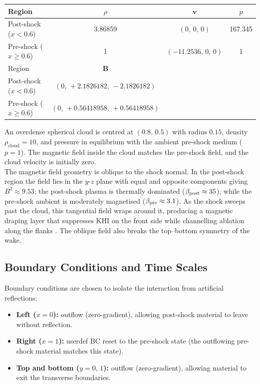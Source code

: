 \documentclass[11pt,a4paper]{article}
\begin{document}
\medskip
\begin{center}
\begin{tabular}{lccc}
\toprule Region & $\rho$ & $\mathbf{v}$ & $p$ \\ \midrule Post-shock ($x < 0.6$) & 3.86859 & $(0,\,0,\,0)$ & 167.345 \\ Pre-shock ($x \ge 0.6$) & 1 & $(-11.2536,\,0,\,0)$ & 1 \\ \midrule Region & $\mathbf{B}$ & & \\ \midrule Post-shock ($x < 0.6$) & $(0,\,+2.1826182,\,-2.1826182)$ & \\ Pre-shock ($x \ge 0.6$) & $(0,\,+0.56418958,\,+0.56418958)$ & \\ \bottomrule
\end{tabular}
\end{center}
\medskip

An overdense spherical cloud is centred at $(0.8,\,0.5)$ with radius $0.15$, density $\rho_{\mathrm{cloud}} = 10$, and pressure in equilibrium with the ambient pre-shock medium ($p = 1$). The magnetic field inside the cloud matches the pre-shock field, and the cloud velocity is initially zero.
\\

The magnetic field geometry is oblique to the shock normal. In the post-shock region the field lies in the $y$-$z$ plane with equal and opposite components giving $B^2 \approx 9.53$; the post-shock plasma is thermally dominated ($\beta_{\rm post} \approx 35$), while the pre-shock ambient is moderately magnetised ($\beta_{\rm pre} \approx 3.1$). As the shock sweeps past the cloud, this tangential field wraps around it, producing a magnetic draping layer that suppresses KHI on the front side while channelling ablation along the flanks \cite{gregori2000, shin2008, dursi2008}. The oblique field also breaks the top--bottom symmetry of the wake.

\subsection{Boundary Conditions and Time Scales}

Boundary conditions are chosen to isolate the interaction from artificial reflections:
\begin{itemize}
  \item \textbf{Left ($x = 0$):} outflow (zero-gradient), allowing post-shock material to leave without reflection.
  \item \textbf{Right ($x = 1$):} userdef BC reset to the pre-shock state (the outflowing pre-shock material matches this state).
  \item \textbf{Top and bottom ($y = 0,\,1$):} outflow (zero-gradient), allowing material to exit the transverse boundaries.
\end{itemize}
\end{document}
